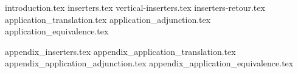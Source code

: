\documentclass[acmsmall,anonymous,screen,review]{acmart}
\theoremstyle{acmdefinition}
\begin{document}
{introduction.tex}
{inserters.tex}
{vertical-inserters.tex}
{inserters-retour.tex}
{application_translation.tex}
{application_adjunction.tex}
{application_equivalence.tex}




\appendix
{appendix_inserters.tex}
{appendix_application_translation.tex}
{appendix_application_adjunction.tex}
{appendix_application_equivalence.tex}
\end{document}
